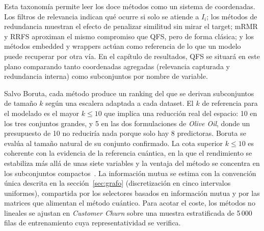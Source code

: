 Esta taxonomía permite leer los doce métodos como un sistema de
coordenadas. Los filtros de relevancia indican qué ocurre si solo se
atiende a $I_i$; los métodos de redundancia muestran el efecto de
penalizar similitud sin mirar el target; mRMR y RRFS aproximan el mismo
compromiso que QFS, pero de forma clásica; y los métodos embedded y
wrappers actúan como referencia de lo que un modelo puede recuperar por
otra vía. En el capítulo de resultados, QFS se situará en este plano
comparando tanto coordenadas agregadas (relevancia capturada y
redundancia interna) como subconjuntos por nombre de variable.

Salvo Boruta, cada método produce un ranking del que se derivan
subconjuntos de tamaño $k$ según una escalera adaptada a cada dataset.
El $k$ de referencia para el modelado es el mayor $k \le 10$ que implica
una reducción real del espacio: 10 en los tres conjuntos grandes, y 5 en
las dos formulaciones de \textit{Olive Oil}, donde un presupuesto de 10
no reduciría nada porque solo hay 8 predictoras. Boruta se evalúa al
tamaño natural de su conjunto confirmado. La cota superior $k \le 10$ es
coherente con la evidencia de la referencia cuántica, en la que el
rendimiento se estabiliza más allá de unas siete variables y la ventaja
del método se concentra en los subconjuntos
compactos~\cite{orquin2026}. La información mutua se estima
con la convención única descrita en la sección~\ref{sec:grafo}
(discretización en cinco intervalos uniformes), compartida por los
selectores basados en información mutua y por las matrices que alimentan
el método cuántico. Para acotar el coste, los métodos no lineales se
ajustan en \textit{Customer Churn} sobre una muestra estratificada de
5\,000 filas de entrenamiento cuya representatividad se verifica.

